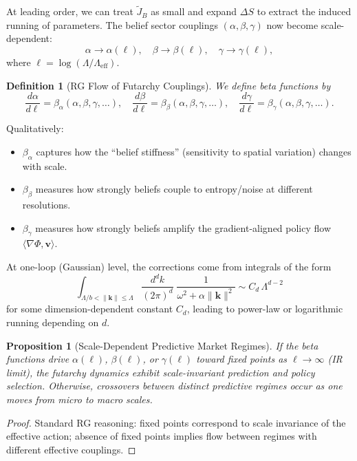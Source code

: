\documentclass[12pt]{article}
\newtheorem{definition}{Definition}
\newtheorem{proposition}{Proposition}
\begin{document}
At leading order, we can treat $\tilde{J}_B$ as small and expand
$\Delta S$ to extract the induced running of parameters. The belief
sector couplings $(\alpha,\beta,\gamma)$ now become scale-dependent:
\[
\alpha \to \alpha(\ell),\quad
\beta \to \beta(\ell),\quad
\gamma \to \gamma(\ell),
\]
where $\ell = \log(\Lambda/\Lambda_{\text{eff}})$.

\begin{definition}[RG Flow of Futarchy Couplings]
We define beta functions by
\[
\frac{d\alpha}{d\ell} = \beta_\alpha(\alpha,\beta,\gamma,\dots),
\quad
\frac{d\beta}{d\ell} = \beta_\beta(\alpha,\beta,\gamma,\dots),
\quad
\frac{d\gamma}{d\ell} = \beta_\gamma(\alpha,\beta,\gamma,\dots).
\]
\end{definition}

Qualitatively:
\begin{itemize}
    \item $\beta_\alpha$ captures how the ``belief stiffness'' (sensitivity to spatial variation) changes with scale.
    \item $\beta_\beta$ measures how strongly beliefs couple to entropy/noise at different resolutions.
    \item $\beta_\gamma$ measures how strongly beliefs amplify the gradient-aligned policy flow $\langle\nabla\Phi,\mathbf{v}\rangle$.
\end{itemize}

At one-loop (Gaussian) level, the corrections come from integrals of the form
\[
\int_{\Lambda/b < \|\mathbf{k}\| \le \Lambda}
\frac{d^d k}{(2\pi)^d}\;
\frac{1}{\omega^2 + \alpha\|\mathbf{k}\|^2}
\sim C_d\,\Lambda^{d-2}
\]
for some dimension-dependent constant $C_d$, leading to power-law or
logarithmic running depending on $d$.

\begin{proposition}[Scale-Dependent Predictive Market Regimes]
If the beta functions drive $\alpha(\ell)$, $\beta(\ell)$, or
$\gamma(\ell)$ toward fixed points as $\ell\to\infty$ (IR limit), the
futarchy dynamics exhibit scale-invariant prediction and policy
selection. Otherwise, crossovers between distinct predictive regimes
occur as one moves from micro to macro scales.
\end{proposition}

\begin{proof}
Standard RG reasoning: fixed points correspond to scale invariance of
the effective action; absence of fixed points implies flow between
regimes with different effective couplings.
\end{proof}
\end{document}
